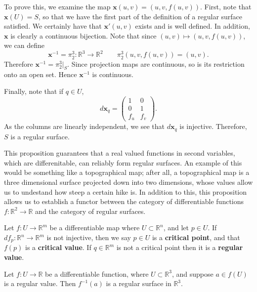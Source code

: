 \documentclass[12pt,letterpaper,boxed]{maths_v5}
\newcommand{\rr}{\mathbb{R}}
\theoremstyle{definition}
\begin{document}
\begin{prf}
    To prove this, we examine the map 
    $\bm{x}(u, v) = (u, v, f(u, v))$. First, note that $\bm{x}(U) = 
    S$, so that we have the first part of the definition of a regular surface satisfied. 
    We certainly have that $\bm{x}'(u, v)$ exists and is well defined. 
    In addition, $\bm{x}$ is clearly a continuous bijection. 
    Note that since $(u, v) \mapsto (u, v, f(u, v))$, we can define 
    \[
        \bm{x}^{-1} = \pi_2^3: \rr^3 \to \rr^2 \qquad \pi_2^3(u, v, f(u, v)) = (u, v).        
    \]
    Therefore $\bm{x}^{-1} = \pi_2^3\big|_{S}$. Since projection maps are continuous, 
    so is its restriction onto an open set. Hence $\bm{x}^{-1}$ is continuous. 

    Finally, note that if $q \in U$,
    \[
        d\bm{x}_q = 
        \begin{pmatrix}
            1 & 0\\
            0 & 1\\
            f_u & f_v 
        \end{pmatrix}.
    \]  
    As the columns are linearly independent, we see that $d\bm{x}_q$ is 
    injective. Therefore, $S$ is a regular surface.
\end{prf}
This proposition guarantees that a real valued functions in second variables, which 
are differenitable, can reliably form regular surfaces. An example of this would 
be something like a topographical map; after all, a topographical map is a three dimensional 
surface projected down into two dimensions, whose values allow us to undestand how
steep a certain hike is. In addition to this, this proposition allows us to establish a functor between the category of 
differentiable functions $f: \rr^2 \to \rr$ and the category of regular surfaces. 

\begin{defn}
    Let $f: U \to \rr^m$ be a differentiable map where $U \subset \rr^n$,
    and let $p \in U$. If $df_p: \rr^n \to \rr^m$ is not injective, then 
    we say $p \in U$ is a \textbf{critical point}, and that $f(p)$ is a 
    \textbf{critical value}. If $q \in \rr^m$ is not a critical point 
    then it is a \textbf{regular value}.
\end{defn}

\begin{prop}
    Let $f:U \to \rr$ be a differentiable function, where $U \subset \rr^3$, and suppose $a \in f(U)$ 
    is a regular value. Then $f^{-1}(a)$ is a regular surface in $\rr^3$.
\end{prop}
    
\end{document}
